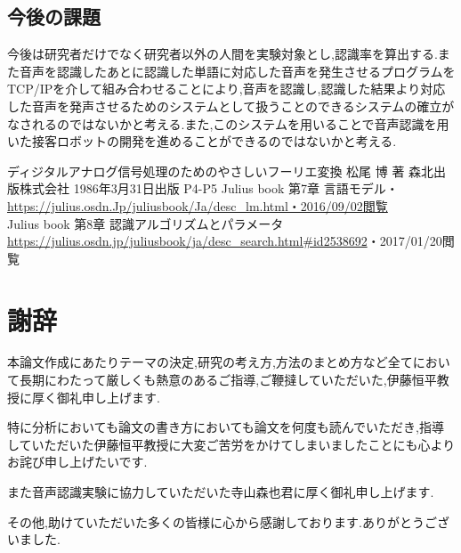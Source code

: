 \documentclass[12pt,oneside]{sotsuken_paper}
\begin{document}
\section{今後の課題}
今後は研究者だけでなく研究者以外の人間を実験対象とし,認識率を算出する.また音声を認識したあとに認識した単語に対応した音声を発生させるプログラムをTCP/IPを介して組み合わせることにより,音声を認識し,認識した結果より対応した音声を発声させるためのシステムとして扱うことのできるシステムの確立がなされるのではないかと考える.また,このシステムを用いることで音声認識を用いた接客ロボットの開発を進めることができるのではないかと考える.


\begin{thebibliography}{9}
 ディジタルアナログ信号処理のためのやさしいフーリエ変換 松尾 博 著 森北出版株式会社 1986年3月31日出版 P4-P5
 Julius book 第7章 言語モデル・\url{https://julius.osdn.Jp/juliusbook/Ja/desc\_lm.html・2016/09/02閲覧}\\
 Julius book 第8章 認識アルゴリズムとパラメータ \url{https://julius.osdn.jp/juliusbook/ja/desc_search.html#id2538692}・2017/01/20閲覧\\
\end{thebibliography}

\chapter*{謝辞}
本論文作成にあたりテーマの決定,研究の考え方,方法のまとめ方など全てにおいて長期にわたって厳しくも熱意のあるご指導,ご鞭撻していただいた,伊藤恒平教授に厚く御礼申し上げます.


特に分析においても論文の書き方においても論文を何度も読んでいただき,指導していただいた伊藤恒平教授に大変ご苦労をかけてしまいましたことにも心よりお詫び申し上げたいです.


また音声認識実験に協力していただいた寺山森也君に厚く御礼申し上げます.


その他,助けていただいた多くの皆様に心から感謝しております.ありがとうございました.
\end{document}

